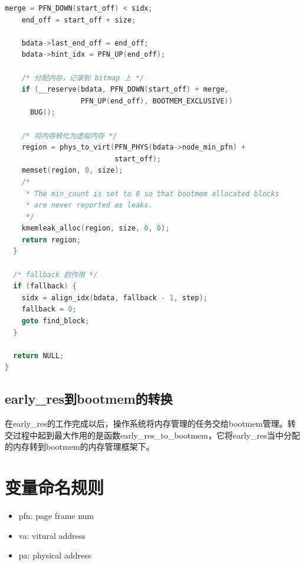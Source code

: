 \documentclass[b5paper,9pt,twoside,openany]{article}
\begin{document}
\begin{lstlisting}[language=C]
    merge = PFN_DOWN(start_off) < sidx;
    end_off = start_off + size;

    bdata->last_end_off = end_off;
    bdata->hint_idx = PFN_UP(end_off);

    /* 分配内存，记录到 bitmap 上 */
    if (__reserve(bdata, PFN_DOWN(start_off) + merge,
                  PFN_UP(end_off), BOOTMEM_EXCLUSIVE))
      BUG();

    /* 将内存转化为虚拟内存 */
    region = phys_to_virt(PFN_PHYS(bdata->node_min_pfn) +
                          start_off);
    memset(region, 0, size);
    /*
     * The min_count is set to 0 so that bootmem allocated blocks
     * are never reported as leaks.
     */
    kmemleak_alloc(region, size, 0, 0);
    return region;
  }

  /* fallback 的作用 */
  if (fallback) {
    sidx = align_idx(bdata, fallback - 1, step);
    fallback = 0;
    goto find_block;
  }

  return NULL;
}

\end{lstlisting}

\subsection{early\_res到bootmem的转换}
在early\_res的工作完成以后，操作系统将内存管理的任务交给bootmem管理。转交过程中起到最大作用的是函数early\_res\_to\_bootmem，它将early\_res当中分配的内存转到bootmem的内存管理框架下。

\section{变量命名规则}
\begin{itemize}
\item pfn:  page frame num
\item va:   vitural address
\item pa:   physical address
\end{itemize}
\end{document}
